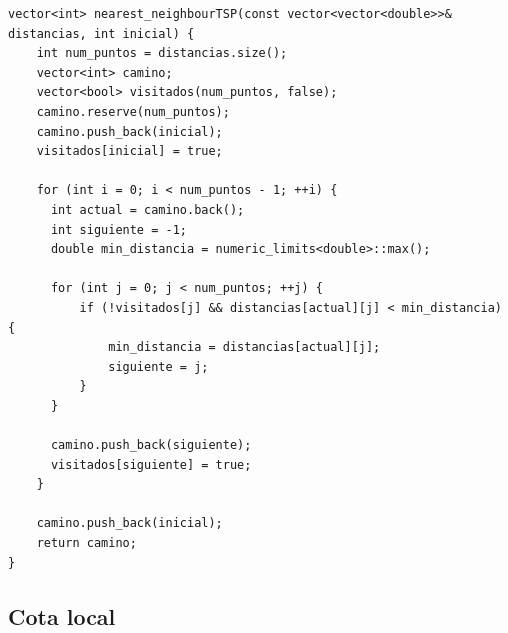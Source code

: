 \documentclass[11pt,openany]{book}
\begin{document}
\begin{lstlisting}
vector<int> nearest_neighbourTSP(const vector<vector<double>>& distancias, int inicial) {
    int num_puntos = distancias.size();
    vector<int> camino;
    vector<bool> visitados(num_puntos, false);
    camino.reserve(num_puntos);
    camino.push_back(inicial);
    visitados[inicial] = true;

    for (int i = 0; i < num_puntos - 1; ++i) {
      int actual = camino.back();
      int siguiente = -1;
      double min_distancia = numeric_limits<double>::max();

      for (int j = 0; j < num_puntos; ++j) {
          if (!visitados[j] && distancias[actual][j] < min_distancia) {
              min_distancia = distancias[actual][j];
              siguiente = j;
          }
      }

      camino.push_back(siguiente);
      visitados[siguiente] = true;
    }

    camino.push_back(inicial);
    return camino;
}

\end{lstlisting} 

      
\subsection{Cota local}
\end{document}
